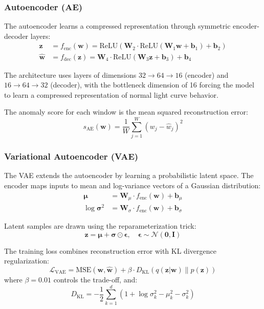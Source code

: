 \documentclass[conference]{IEEEtran}
\begin{document}
\subsubsection{Autoencoder (AE)}
The autoencoder learns a compressed representation through symmetric encoder-decoder layers:
\begin{align}
\mathbf{z} &= f_{\text{enc}}(\mathbf{w}) = \text{ReLU}(\mathbf{W}_2 \cdot \text{ReLU}(\mathbf{W}_1 \mathbf{w} + \mathbf{b}_1) + \mathbf{b}_2) \\
\hat{\mathbf{w}} &= f_{\text{dec}}(\mathbf{z}) = \mathbf{W}_4 \cdot \text{ReLU}(\mathbf{W}_3 \mathbf{z} + \mathbf{b}_3) + \mathbf{b}_4
\end{align}

The architecture uses layers of dimensions $32 \to 64 \to 16$ (encoder) and $16 \to 64 \to 32$ (decoder), with the bottleneck dimension of 16 forcing the model to learn a compressed representation of normal light curve behavior.

The anomaly score for each window is the mean squared reconstruction error:
\begin{equation}
s_{\text{AE}}(\mathbf{w}) = \frac{1}{W} \sum_{j=1}^{W} (w_j - \hat{w}_j)^2
\end{equation}

\subsubsection{Variational Autoencoder (VAE)}
The VAE extends the autoencoder by learning a probabilistic latent space. The encoder maps inputs to mean and log-variance vectors of a Gaussian distribution:
\begin{align}
\boldsymbol{\mu} &= \mathbf{W}_\mu \cdot f_{\text{enc}}(\mathbf{w}) + \mathbf{b}_\mu \\
\log \boldsymbol{\sigma}^2 &= \mathbf{W}_\sigma \cdot f_{\text{enc}}(\mathbf{w}) + \mathbf{b}_\sigma
\end{align}

Latent samples are drawn using the reparameterization trick:
\begin{equation}
\mathbf{z} = \boldsymbol{\mu} + \boldsymbol{\sigma} \odot \boldsymbol{\epsilon}, \quad \boldsymbol{\epsilon} \sim \mathcal{N}(\mathbf{0}, \mathbf{I})
\end{equation}

The training loss combines reconstruction error with KL divergence regularization:
\begin{equation}
\mathcal{L}_{\text{VAE}} = \text{MSE}(\mathbf{w}, \hat{\mathbf{w}}) + \beta \cdot D_{\text{KL}}(q(\mathbf{z}|\mathbf{w}) \| p(\mathbf{z}))
\end{equation}
where $\beta = 0.01$ controls the trade-off, and:
\begin{equation}
D_{\text{KL}} = -\frac{1}{2} \sum_{k=1}^{d} \left(1 + \log \sigma_k^2 - \mu_k^2 - \sigma_k^2\right)
\end{equation}
\end{document}
